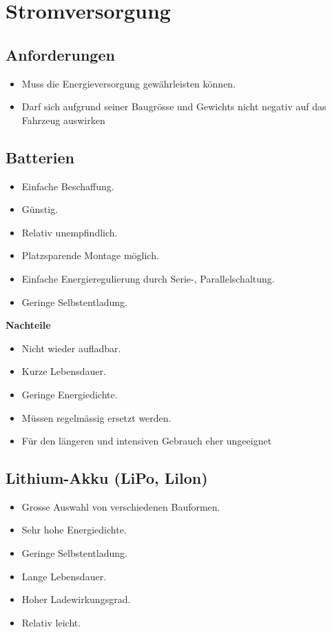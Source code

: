 \section{Stromversorgung}

\subsection {Anforderungen}
\begin{itemize}
\item Muss die Energieversorgung gewährleisten können.
\item Darf sich aufgrund seiner Baugrösse und Gewichts nicht negativ auf das Fahrzeug auswirken
\end{itemize}

\subsection {Batterien}

\begin{itemize}
\item Einfache Beschaffung.
\item Günstig.
\item Relativ unempfindlich.
\item Platzsparende Montage möglich.
\item Einfache Energieregulierung durch Serie-, Parallelschaltung.
\item Geringe Selbstentladung.
\end{itemize}

\textbf {Nachteile}
\begin{itemize}
\item Nicht wieder aufladbar. 
\item Kurze Lebensdauer.	
\item Geringe Energiedichte.
\item Müssen regelmässig ersetzt werden.
\item Für den längeren und intensiven Gebrauch eher ungeeignet
\end{itemize}

\subsection {Lithium-Akku (LiPo, Lilon)}

\begin{itemize}
\item Grosse Auswahl von verschiedenen Bauformen.
\item Sehr hohe Energiedichte.
\item Geringe Selbstentladung.
\item Lange Lebensdauer.
\item Hoher Ladewirkungsgrad.
\item Relativ leicht.
\end{itemize}

